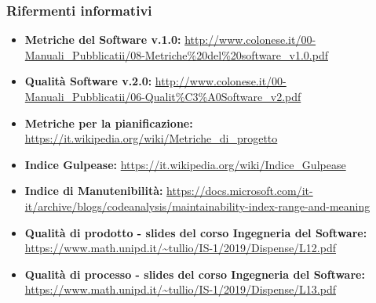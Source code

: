 \subsubsection{Rifermenti informativi}
\begin{itemize}
\item \textbf{Metriche del Software v.1.0:} \url{http://www.colonese.it/00-Manuali_Pubblicatii/08-Metriche%20del%20software_v1.0.pdf}
\item \textbf{Qualità Software v.2.0:} \url{http://www.colonese.it/00-Manuali_Pubblicatii/06-Qualit%C3%A0Software_v2.pdf}
\item \textbf{Metriche per la pianificazione:} \url{https://it.wikipedia.org/wiki/Metriche_di_progetto}
\item \textbf{Indice Gulpease:} \url{https://it.wikipedia.org/wiki/Indice_Gulpease}
\item \textbf{Indice di Manutenibilità:} \url{https://docs.microsoft.com/it-it/archive/blogs/codeanalysis/maintainability-index-range-and-meaning}
\item \textbf{Qualità di prodotto - slides del corso Ingegneria del Software:} \url{https://www.math.unipd.it/~tullio/IS-1/2019/Dispense/L12.pdf}
\item \textbf{Qualità di processo - slides del corso Ingegneria del Software:} \url{https://www.math.unipd.it/~tullio/IS-1/2019/Dispense/L13.pdf}
\end{itemize}
